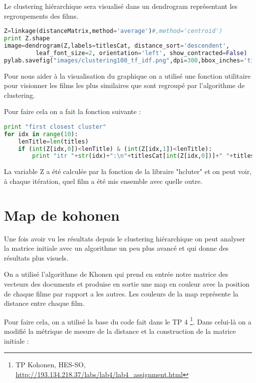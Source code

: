 Le clustering hiérarchique sera visualisé dans un dendrogram représentant les regroupements des films. \\

\begin{lstlisting}[language=python]
Z=linkage(distanceMatrix,method='average')#,method='centroid')
print Z.shape
image=dendrogram(Z,labels=titlesCat, distance_sort='descendent',
         leaf_font_size=2, orientation='left', show_contracted=False)
pylab.savefig("images/clustering100_tf_idf.png",dpi=300,bbox_inches='tight')	 	  
\end{lstlisting}

Pour nous aider à la visualisation du graphique on a utilisé une fonction utilitaire pour visionner les films les plus similaires que sont regroupé par l'algorithme de clustering.

Pour faire cela on a fait la fonction suivante : \\

\begin{lstlisting}[language=python]
print "first closest cluster"
for idx in range(10):
    lenTitle=len(titles)
    if (int(Z[idx,0])<lenTitle) & (int(Z[idx,1])<lenTitle):
        print "itr "+str(idx)+":\n"+titlesCat[int(Z[idx,0])]+" "+titlesCat[int(Z[idx,1])]
\end{lstlisting}

La variable Z a été calculée par la fonction de la libraire "hcluter" et on peut voir, à chaque itération, quel film a été mis ensemble avec quelle outre.	


\section{Map de kohonen}

Une fois avoir vu les résultats depuis le clustering hiérarchique on peut analyser la matrice initiale avec un algorithme un peu plus avancé et qui donne des résultats plus visuels.

On a utilisé l'algorithme de Khonen qui prend en entrée notre matrice des vecteurs des documents et produise en sortie une map en couleur avec la position de chaque filme par rapport a les autres. Les couleurs de la map représente la distance entre chaque film. 

Pour faire cela, on a utilisé la base du code fait dans le TP 
4 \footnote{TP Kohonen, HES-SO, \url{http://193.134.218.37/labs/lab4/lab4_assignment.html}}. Dans celui-là  on a modifié la métrique de mesure de la distance et la construction de la matrice initiale : \\

